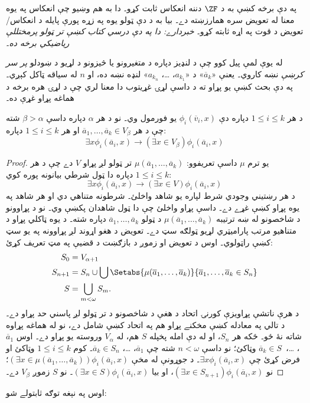 \documentclass[../../../include/open-logic-section]{subfiles}
\begin{document}

په دې برخه کښې به د $\ZF$ دننه انعکاس ثابت کړو۔ دا به هم وښيو چې
انعکاس په يوه معنا له تعويض سره همارزښته دے۔ بيا به د دې ټولو يوه
په زړه پورې پايله د انعکاس/تعويض د قوت په اړه ثابته کړو۔
\emph{خبردارے: دا په دې درسي کتاب کښې تر ټولو پرمختللې رياضيکي برخه ده۔}

له يوې لمې پيل کوو چې د لنډيز دپاره د متغيرونو يا څيزونو د لړيو
د ښودلو \emph{پر سر کرښې} نښه کاروي۔ يعنې «$\overline{a}_k$» د
«$a_{k_1}$، \dots، $a_{k_n}$» لنډه نښه ده، او $n$ له سياقه
ټاکل کېږي۔ په دې بحث کښې يو پړاو ته د داسې لړۍ غړيتوب
دا معنا لري چې د لړۍ هره برخه د هماغه پړاو غړې ده۔

\begin{lem}
د هر $1 \leq i \leq k$ دپاره دې $\phi_i(\overline{v}_i, x)$
يو فورمول وي۔ نو د هر $\alpha$ دپاره داسې $\beta > \alpha$ شته چې
د هر $\overline{a}_1,
\ldots, \overline{a}_k \in V_\beta$ او هر $1 \leq i \leq k$
دپاره:
\[
	\exists x\phi_i(\overline{a}_i, x) \rightarrow (\exists x \in V_\beta) \phi_i(\overline{a}_i, x)
\]
\end{lem}

\begin{proof}
يو ترم $\mu$ داسې تعريفوو: $\mu(\overline{a}_1, \ldots,
\overline{a}_k)$ تر ټولو لږ پړاو $V$ دے چې د هر $1 \leq i \leq k$
دپاره دا ټول شرطي بيانونه پوره کوي:
\[
\exists x\phi_i(\overline{a}_i, x) \rightarrow (\exists x \in V) \phi_i(\overline{a}_i, x)
\]
د هر رښتيني وجودي شرط لپاره يو شاهد واخلئ۔ شرطونه
متناهي دي او هر شاهد په يوه پړاو کښې غړے دے۔ داسې پړاو
واخلئ چې دا ټول شاهدان پکښې وي۔ نو د پړاوونو د شاخصونو
له ښه ترتيبه
$\mu(\overline{a}_1, \ldots, \overline{a}_k)$ د ټولو
$\overline{a}_1, \ldots, \overline{a}_k$ دپاره شته۔ د يوه ټاکلي
پړاو د متناهيو مرتب پاراميټري لړيو ټولګه سټ دے۔ تعويض د هغو
اړوند لږ پړاوونه په يو سټ کښې راټولوي۔ اوس د تعويض
او زموږ د بازګښت د قضيې په مټ تعريف کړئ:
\begin{align*}
	S_0 & = V_{\alpha+1}\\
	S_{n+1} & = S_n \cup \bigcup
	\Setabs{\mu(\overline{a}_1, \ldots, \overline{a}_k)}
	{\overline{a}_1, \ldots, \overline{a}_k \in S_n} \\
	S &= \bigcup_{m < \omega} S_m.
\end{align*}
د هرې ناتشې پړاويزې کورنۍ اتحاد د هغې د شاخصونو د
تر ټولو لږ پاسني حد پړاو دے۔ د تالي په معادله کښې مخکنے
پړاو هم په اتحاد کښې شامل دے، نو له هماغه پړاوه شاته
نۀ ځو۔ ځکه هر $S_n$، او له دې امله پخپله $S$ هم،
له $V_\alpha$ وروسته يو پړاو دے۔ اوس
$\overline{a}_1$، \dots،~$\overline{a}_k \in S$ وټاکئ؛ نو
داسې $n < \omega$ شته چې $\overline{a}_1$، \dots،
$\overline{a}_k \in S_n$۔ کوم $1 \leq i \leq k$ وټاکئ او فرض
کړئ چې $\exists x \phi_i(\overline{a}_i,x)$۔ د جوړونې له مخې
$(\exists x \in \mu(\overline{a}_1,\ldots, \overline{a}_k))
\phi_i(\overline{a}_i, x)$؛ نو
$(\exists x \in S_{n+1})\phi_i(\overline{a}_i, x)$، او بيا
$(\exists x \in S)\phi_i(\overline{a}_i, x)$۔ نو $S$ زموږ
$V_\beta$ دے۔
\end{proof}
\noindent
اوس  په نېغه توګه
ثابتولے شو:
\end{document}
